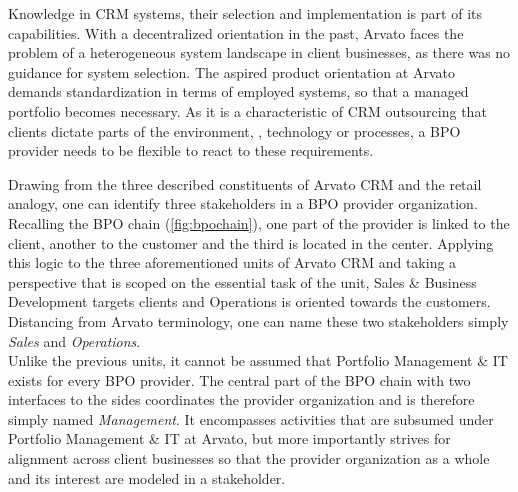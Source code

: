  Knowledge in CRM systems, their selection and implementation is part of its capabilities. With a decentralized orientation in the past, Arvato faces the problem of a heterogeneous system landscape in client businesses, as there was no guidance for system selection. The aspired product orientation at Arvato demands standardization in terms of employed systems, so that a managed portfolio becomes necessary. As it is a characteristic of CRM outsourcing that clients dictate parts of the environment, \eg, technology or processes, a BPO provider needs to be flexible to react to these requirements. 
 
  Drawing from the three described constituents of Arvato CRM and the retail analogy, one can identify three stakeholders in a BPO provider organization. Recalling the BPO chain (\Fig \ref{fig:bpochain}), one part of the provider is linked to the client, another to the customer and the third is located in the center. Applying this logic to the three aforementioned units of Arvato CRM and taking a perspective that is scoped on the essential task of the unit, Sales \& Business Development targets clients and Operations is oriented towards the customers. Distancing from Arvato terminology, one can name these two stakeholders simply \textit{Sales} and \textit{Operations}. \\
  
  Unlike the previous units, it cannot be assumed that Portfolio Management \& IT exists for every \acrshort{BPO} provider. The central part of the \acrshort{BPO} chain with two interfaces to the sides coordinates the provider organization and is therefore simply named \textit{Management}. It encompasses activities that are subsumed under Portfolio Management \& IT at Arvato, but more importantly strives for alignment across client businesses so that the provider organization as a whole and its interest are modeled in a stakeholder. 
  

